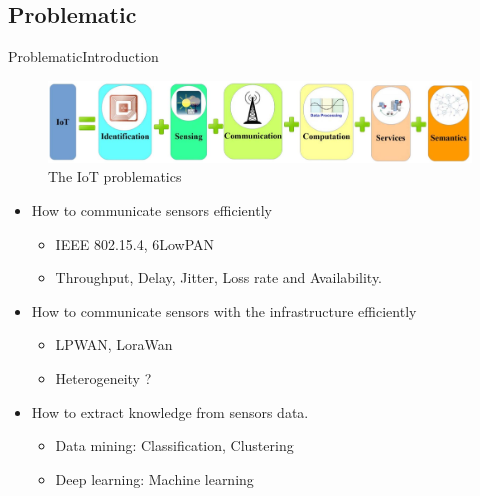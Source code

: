 \subsection*{Problematic}
\begin{frame}{Problematic}{Introduction} %


\begin{figure}
	\includegraphics[width=.7\columnwidth]{res/iotChallenges.png}
	\caption{\label{fig:iotChallenges}The IoT problematics}
\end{figure}
\begin{itemize}
	\item How to communicate sensors efficiently
		\begin{itemize}
			\item IEEE 802.15.4, 6LowPAN
			\item Throughput, Delay, Jitter, Loss rate and Availability.
		\end{itemize}
	\item How to communicate sensors with the infrastructure efficiently
		\begin{itemize}
			\item LPWAN, LoraWan
			\item Heterogeneity ?
		\end{itemize}
	\item How to extract knowledge from sensors data.
		\begin{itemize}
			\item Data mining: Classification, Clustering
			\item Deep learning: Machine learning
		\end{itemize}
	\end{itemize}
	\end{frame}
